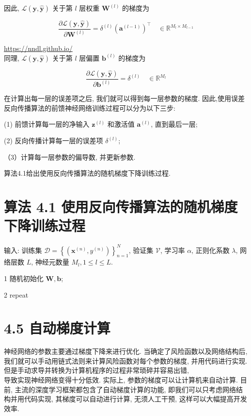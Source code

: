 \documentclass[10pt]{article}
\begin{document}
因此, $\mathcal{L}(\boldsymbol{y}, \hat{\boldsymbol{y}})$ 关于第 $l$ 层权重 $\boldsymbol{W}^{(l)}$ 的梯度为


\begin{equation*}
\frac{\partial \mathcal{L}(\boldsymbol{y}, \hat{\boldsymbol{y}})}{\partial \boldsymbol{W}^{(l)}}=\delta^{(l)}\left(\boldsymbol{a}^{(l-1)}\right)^{\top} \quad \in \mathbb{R}^{M_{l} \times M_{l-1}} \tag{4.68}
\end{equation*}


\href{https://nndl.github.io/}{https://nndl.github.io/}\\
同理, $\mathcal{L}(\boldsymbol{y}, \hat{\boldsymbol{y}})$ 关于第 $l$ 层偏置 $\boldsymbol{b}^{(l)}$ 的梯度为


\begin{equation*}
\frac{\partial \mathcal{L}(\boldsymbol{y}, \hat{\boldsymbol{y}})}{\partial \boldsymbol{b}^{(l)}}=\delta^{(l)} \quad \in \mathbb{R}^{M_{l}} \tag{4.69}
\end{equation*}


在计算出每一层的误差项之后, 我们就可以得到每一层参数的梯度. 因此,使用误差反向传播算法的前馈神经网络训练过程可以分为以下三步:

(1) 前馈计算每一层的净输入 $\boldsymbol{z}^{(l)}$ 和激活值 $\boldsymbol{a}^{(l)}$, 直到最后一层;

(2) 反向传播计算每一层的误差项 $\delta^{(l)}$;

（3）计算每一层参数的偏导数, 并更新参数.

算法4.1给出使用反向传播算法的随机梯度下降训练过程.

\section*{算法 4.1 使用反向传播算法的随机梯度下降训练过程}
输入: 训练集 $\mathcal{D}=\left\{\left(\boldsymbol{x}^{(n)}, y^{(n)}\right)\right\}_{n=1}^{N}$, 验证集 $\mathcal{V}$, 学习率 $\alpha$, 正则化系数 $\lambda$, 网络层数 $L$, 神经元数量 $M_{l}, 1 \leq l \leq L$.

1 随机初始化 $\boldsymbol{W}, \boldsymbol{b}$;

2 repeat



\section*{4.5 自动梯度计算}
神经网络的参数主要通过梯度下降来进行优化. 当确定了风险函数以及网络结构后, 我们就可以手动用链式法则来计算风险函数对每个参数的梯度, 并用代码进行实现. 但是手动求导并转换为计算机程序的过程非常琐碎并容易出错,\\
导致实现神经网络变得十分低效. 实际上, 参数的梯度可以让计算机来自动计算. 目前, 主流的深度学习框架都包含了自动梯度计算的功能, 即我们可以只考虑网络结构并用代码实现, 其梯度可以自动进行计算, 无须人工干预, 这样可以大幅提高开发效率.
\end{document}
